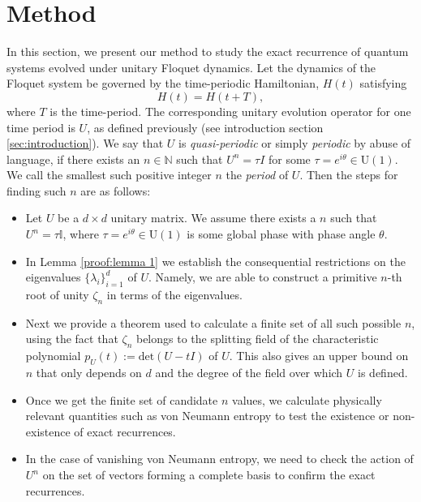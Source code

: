 \documentclass[a4paper,onecolumn,accepted=2026-04-08,10pt]{quantumarticle}
\theoremstyle{definition}
\begin{document}
\section{Method}\label{sec: method}

In this section, we present our method to study the exact recurrence of quantum systems evolved under unitary Floquet dynamics. Let the dynamics of the Floquet system be governed by the time-periodic Hamiltonian, $H(t)$ satisfying
\begin{equation}
    H(t) = H(t+T),
\end{equation}
where $T$ is the time-period.  The corresponding unitary evolution operator for one time period is $U$, as defined previously (see introduction section \ref{sec:introduction}).  We say that $U$ is \textit{quasi-periodic} or simply \textit{periodic} by abuse of language, if there exists an $n \in \mathbb{N}$ such that $U^n = \tau I$ for some $\tau = e^{i \theta} \in \mathrm{U}(1)$.  We call the smallest such positive integer $n$ the \textit{period} of $U$.
Then the steps for finding such $n$ are as follows:
\begin{itemize}
    \item Let $U$ be a $d\times d$ unitary matrix.  We assume there exists a $n$ such that $U^n= \tau \mathbb{I}$, where $\tau=e^{i\theta} \in \mathrm{U}(1)$ is some global phase with phase angle $\theta$.
    \item In Lemma \ref{proof:lemma 1} we establish the consequential restrictions on the eigenvalues $\{\lambda_{i}\}_{i=1}^{d}$ of $U$.  Namely, we are able to construct a primitive $n$-th root of unity $\zeta_n$ in terms of the eigenvalues.  
    \item Next we provide a theorem used to calculate a finite set of all such possible $n$, using the fact that $\zeta_n$ belongs to the splitting field of the characteristic polynomial $p_{U}(t) := \text{det}(U-tI)$ of $U$. This also gives an upper bound on $n$ that only depends on $d$ and the degree of the field over which $U$ is defined.
    \item Once we get the finite set of candidate $n$ values, we calculate physically relevant quantities such as von Neumann entropy to test the existence or non-existence of exact recurrences.
    \item In the case of vanishing von Neumann entropy, we need to check the action of $U^n$ on the set of vectors forming a complete basis to confirm the exact recurrences. 
\end{itemize}
\end{document}
